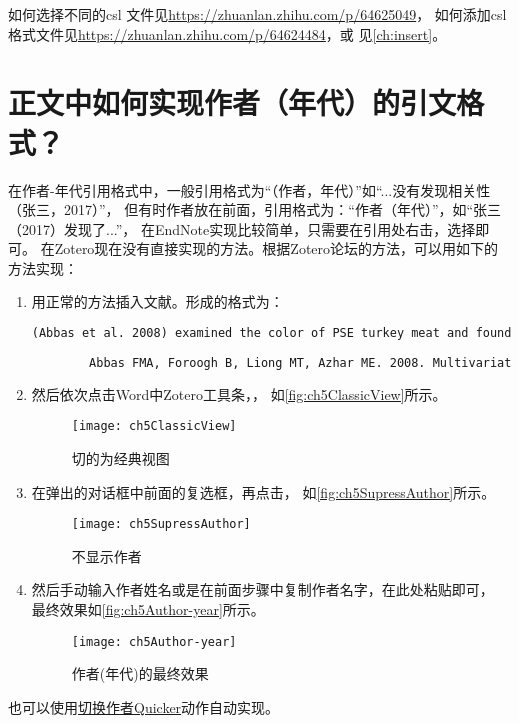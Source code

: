 \documentclass[theorem=false,mathfont=none,openany,sub3section]{easybook}
\begin{document}
{如何选择不同的csl 文件见\url{https://zhuanlan.zhihu.com/p/64625049}，
如何添加csl 格式文件见\url{https://zhuanlan.zhihu.com/p/64624484}，或
见\cref{ch:insert}。

\section{正文中如何实现作者（年代）的引文格式？}\label{sec:author_year}
在作者-年代引用格式中，一般引用格式为“（作者，年代）”如“...没有发现相关性（张三，2017）”，
但有时作者放在前面，引用格式为：“作者（年代）”，如“张三（2017）发现了...”，
在EndNote实现比较简单，只需要在引用处右击，选择即可。
在Zotero现在没有直接实现的方法。根据Zotero论坛的方法，可以用如下的方法实现：
\begin{enumerate}
	\item 用正常的方法插入文献。形成的格式为：\label{it:copyAuthor}
	\begin{lstlisting}[language=HTML]
		(Abbas et al. 2008) examined the color of PSE turkey meat and found that the L* value was significantly negative correlated.
		
		Abbas FMA, Foroogh B, Liong MT, Azhar ME. 2008. Multivariate statistical analysis of antioxidants in dates (phoenix dactylifera). Int. Food Res. J. 15(2):193–200
	\end{lstlisting}
	\item 然后依次点击Word中Zotero工具条，，
	如\autoref{fig:ch5ClassicView}所示。
	\begin{figure}[htbp]
		\centering
		\texttt{[image: ch5ClassicView]}
		\caption{切的为经典视图}
		\label{fig:ch5ClassicView}
	\end{figure}
	\item 在弹出的对话框中前面的复选框，再点击，
	如\autoref{fig:ch5SupressAuthor}所示。
	\begin{figure}[htbp]
		\centering
		\texttt{[image: ch5SupressAuthor]}
		\caption{不显示作者}
		\label{fig:ch5SupressAuthor}
	\end{figure}
	\item 然后手动输入作者姓名或是在前面步骤中复制作者名字，在此处粘贴即可，
	最终效果如\autoref{fig:ch5Author-year}所示。
	\begin{figure}[htbp]
		\centering
		\texttt{[image: ch5Author-year]}
		\caption{作者(年代)的最终效果}
		\label{fig:ch5Author-year}
	\end{figure}
\end{enumerate}
也可以使用\href{https://getquicker.net/Sharedaction?code=c9c174a1-8ad8-46b7-4cd9-08da16aad73c}{切换作者}\href{https://getquicker.net/}{Quicker}动作自动实现。

}
\end{document}
